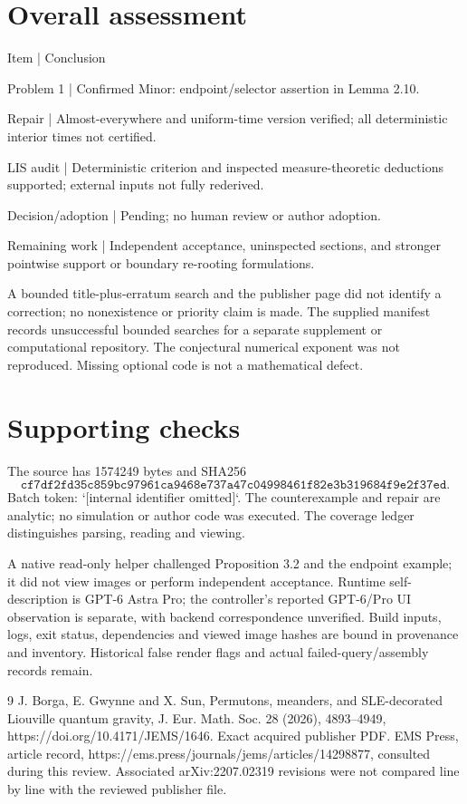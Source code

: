 \documentclass[10pt]{article}
\begin{document}
\section*{Overall assessment}
Item | Conclusion\par
Problem 1 | Confirmed Minor: endpoint/selector assertion in Lemma 2.10.\par
Repair | Almost-everywhere and uniform-time version verified; all deterministic interior times not certified.\par
LIS audit | Deterministic criterion and inspected measure-theoretic deductions supported; external inputs not fully rederived.\par
Decision/adoption | Pending; no human review or author adoption.\par
Remaining work | Independent acceptance, uninspected sections, and stronger pointwise support or boundary re-rooting formulations.\par
A bounded title-plus-erratum search and the publisher page did not identify a correction; no nonexistence or priority claim is made. The supplied manifest records unsuccessful bounded searches for a separate supplement or computational repository. The conjectural numerical exponent was not reproduced. Missing optional code is not a mathematical defect.\par
\section*{Supporting checks}
The source has 1574249 bytes and SHA256 \[\texttt{cf7df2fd35c859bc97961ca9468e737a47c04998461f82e3b319684f9e2f37ed}.\] Batch token: `[internal identifier omitted]`. The counterexample and repair are analytic; no simulation or author code was executed. The coverage ledger distinguishes parsing, reading and viewing.\par
A native read-only helper challenged Proposition 3.2 and the endpoint example; it did not view images or perform independent acceptance. Runtime self-description is GPT-6 Astra Pro; the controller’s reported GPT-6/Pro UI observation is separate, with backend correspondence unverified. Build inputs, logs, exit status, dependencies and viewed image hashes are bound in provenance and inventory. Historical false render flags and actual failed-query/assembly records remain.\par
9 J. Borga, E. Gwynne and X. Sun, Permutons, meanders, and SLE-decorated Liouville quantum gravity, J. Eur. Math. Soc. 28 (2026), 4893–4949, https://doi.org/10.4171/JEMS/1646. Exact acquired publisher PDF. EMS Press, article record, https://ems.press/journals/jems/articles/14298877, consulted during this review. Associated arXiv:2207.02319 revisions were not compared line by line with the reviewed publisher file.\par
\end{document}
